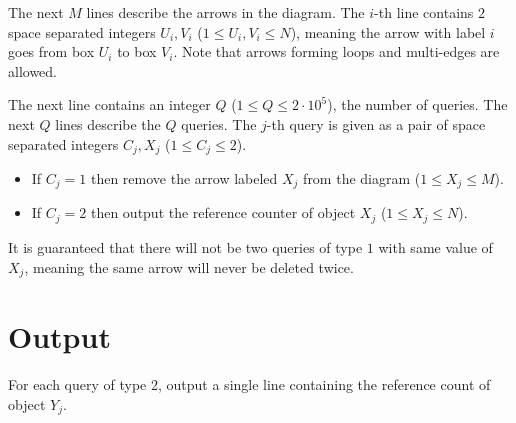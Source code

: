 The next $M$ lines describe the arrows in the diagram. The $i$-th line contains $2$ space separated integers $U_i,V_i$ ($1 \leq U_i,V_i \leq N$), 
meaning the arrow with label $i$ goes from box $U_i$ to box $V_i$. 
Note that arrows forming loops and multi-edges are allowed.

The next line contains an integer $Q$ ($1 \leq Q \leq 2 \cdot 10^5$), the number of queries.
The next $Q$ lines describe the $Q$ queries. The $j$-th query is given as a pair of space separated integers $C_j, X_j$ ($1 \leq C_j \leq 2$).

\begin{itemize}
 \item If $C_j = 1$ then remove the arrow labeled $X_j$ from the diagram ($1 \leq X_j \leq M$).
 \item If $C_j = 2$ then output the reference counter of object $X_j$ ($1 \leq X_j \leq N$). 
\end{itemize}
It is guaranteed that there will not be two queries of type $1$ with same value of $X_j$,
meaning the same arrow will never be deleted twice.

\section*{Output}
For each query of type $2$, output a single line containing the reference count of object $Y_j$.

